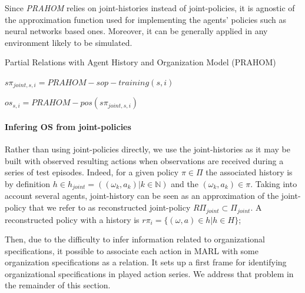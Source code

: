 \documentclass[runningheads]{llncs}
\newcounter{relation}
\begin{document}
Since \emph{PRAHOM} relies on joint-histories instead of joint-policies, it is agnostic of the approximation function used for implementing the agents' policies such as neural networks based ones. Moreover, it can be generally applied in any environment likely to be simulated.


\begin{algorithm}[hbt!]
    \caption{Partial Relations with Agent History and Organization Model (PRAHOM)}\label{alg:prahom}



    $s\pi_{joint,s,i} = PRAHOM-sop-training(s,i)$

    $os_{s,i} = PRAHOM-pos(s\pi_{joint,s,i})$

\end{algorithm}

\paragraph{\textbf{Infering OS from joint-policies}}

Rather than using joint-policies directly, we use the joint-histories as it may be built with observed resulting actions when observations are received during a series of test episodes. Indeed, for a given policy $\pi \in \Pi$ the associated history is by definition $h \in h_{joint} = ((\omega_k,a_k) | k \in \mathbb{N})$ and the $(\omega_k,a_k) \in \pi$. Taking into account several agents, joint-history can be seen as an approximation of the joint-policy that we refer to as reconstructed joint-policy $R\Pi_{joint} \subset \Pi_{joint}$. A reconstructed policy with a history is $r\pi_i = \{(\omega, a) \in h | h \in H\}$;

Then, due to the difficulty to infer information related to organizational specifications, it possible to associate each action in MARL with some organization specifications as a  relation. It sets up a first frame for identifying organizational specifications in played action series. We address that problem in the remainder of this section.
\end{document}
